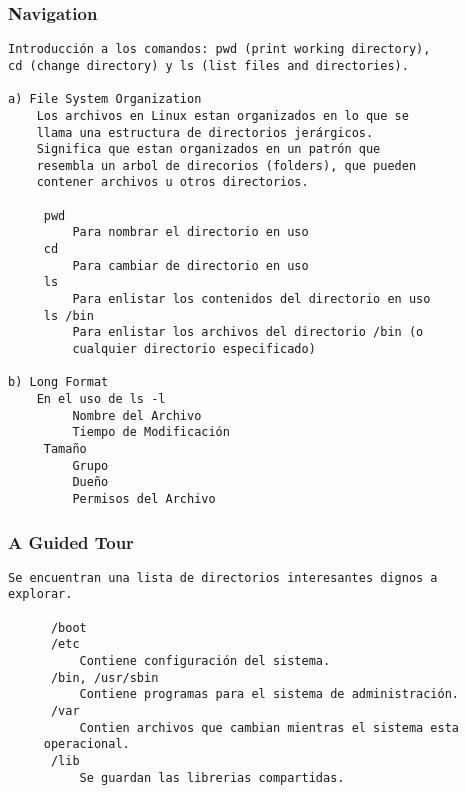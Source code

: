\documentclass{article}
\begin{document}
\subsubsection{Navigation}
\begin{verbatim}
Introducción a los comandos: pwd (print working directory), 
cd (change directory) y ls (list files and directories).

a) File System Organization
   	Los archivos en Linux estan organizados en lo que se 
    llama una estructura de directorios jerárgicos.
    Significa que estan organizados en un patrón que 
    resembla un arbol de direcorios (folders), que pueden 
    contener archivos u otros directorios.

	 pwd
	     Para nombrar el directorio en uso
	 cd
	     Para cambiar de directorio en uso
	 ls
	     Para enlistar los contenidos del directorio en uso
	 ls /bin
	     Para enlistar los archivos del directorio /bin (o
	     cualquier directorio especificado)

b) Long Format
   	En el uso de ls -l
	     Nombre del Archivo
	     Tiempo de Modificación
     Tamaño
	     Grupo
	     Dueño
	     Permisos del Archivo
\end{verbatim}
\subsubsection{A Guided Tour}
\begin{verbatim}
Se encuentran una lista de directorios interesantes dignos a
explorar.

      /boot
      /etc
     	  Contiene configuración del sistema.
      /bin, /usr/sbin
     	  Contiene programas para el sistema de administración.
      /var
     	  Contien archivos que cambian mientras el sistema esta
     operacional.
      /lib
     	  Se guardan las librerias compartidas.
\end{verbatim}
\end{document}
